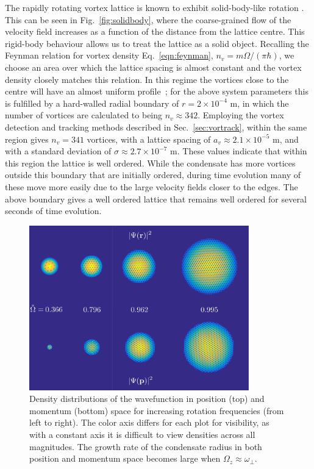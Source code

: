The rapidly rotating vortex lattice is known to exhibit solid-body-like rotation \cite{Vtx:AboShaeer_sci_2001}. This can be seen in Fig.~\ref{fig:solidbody}, where the coarse-grained flow of the velocity field increases as a function of the distance from the lattice centre. This rigid-body behaviour allows us to treat the lattice as a solid object. Recalling the Feynman relation for vortex density Eq.~\eqref{eqn:feynman}, $n_v = m\Omega/(\pi\hbar)$, we choose an area over which the lattice spacing is almost constant and the vortex density closely matches this relation. In this regime the vortices close to the centre will have an almost uniform profile~\cite{VTX:Watanabe_pra_2006}; for the above system parameters this is fulfilled by a hard-walled radial boundary of $r=2\times 10^{-4}$ m, in which the number of vortices are calculated to being $n_v \approx 342$. Employing the vortex detection and tracking methods described in Sec.~\ref{sec:vortrack}, within the same region gives $n_v = 341$ vortices, with a lattice spacing of $a_v \approx 2.1\times 10^{-5}$ m, and with a standard deviation of $\sigma \approx 2.7 \times 10^{-7}$ m. These values indicate that within this region the lattice is well ordered. While the condensate has more vortices outside this boundary that are initially ordered, during time evolution many of these move more easily due to the large velocity fields closer to the edges. The above boundary gives a well ordered lattice that remains well ordered for several seconds of time evolution.

\begin{figure}\centering
    \includegraphics[width=0.85\textwidth]{Images/ch4_vtx/ramp_omega_2.pdf}
    \caption{Density distributions of the wavefunction in position (top) and momentum (bottom) space for increasing rotation frequencies (from left to right). The color axis differs for each plot for visibility, as with a constant axis it is difficult to view densities across all magnitudes. The growth rate of the condensate radius in both position and momentum space becomes large when $\Omega_z \approx \omega_\perp$.}
    \label{fig:inc_omega}
\end{figure}

